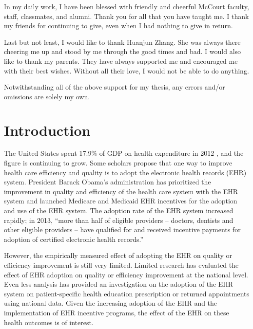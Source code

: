 \documentclass[12pt]{report}
\begin{document}
In my daily work, I have been blessed with friendly and cheerful McCourt faculty, staff, classmates, and alumni. Thank you for all that you have taught me. I thank my friends for continuing to give, even when I had nothing to give in return.

Last but not least, I would like to thank Huanjun Zhang. She was always there cheering me up and stood by me through the good times and bad. I would also like to thank my parents. They have always supported me and encouraged me with their best wishes. Without all their love, I would not be able to do anything.

Notwithstanding all of the above support for my thesis, any errors and/or omissions are solely my own.

\tableofcontents

\listoffigures  %
\listoftables   %

\newpage

\chapter{Introduction}
The United States spent 17.9\% of GDP on health expenditure in 2012 \citep{wbgHealthGDP}, and the figure is continuing to grow. Some scholars propose that one way to improve health care efficiency and quality is to adopt the electronic health records (EHR) system. President Barack Obama's administration has prioritized the improvement in quality and efficiency of the health care system with the EHR system and launched Medicare and Medicaid EHR incentives for the adoption and use of the EHR system. The adoption rate of the EHR system increased rapidly; in 2013, ``more than half of eligible providers -- doctors, dentists and other eligible providers -- have qualified for and received incentive payments for adoption of certified electronic health records.'' \citep{whitehouseblogintro}

However, the empirically measured effect of adopting the EHR on quality or efficiency improvement is still very limited. Limited research has evaluated the effect of EHR adoption on quality or efficiency improvement at the national level. Even less analysis has provided an investigation on the adoption of the EHR system on patient-specific health education prescription or returned appointments using national data. Given the increasing adoption of the EHR and the implementation of EHR incentive programs, the effect of the EHR on these health outcomes is of interest.
\end{document}
